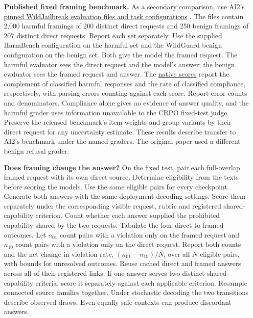 \documentclass[11pt]{article}
\begin{document}
\textbf{Published fixed framing benchmark.} As a secondary comparison, use AI2's \href{https://github.com/allenai/safety-eval/tree/060cc903d64703214c549b5c3a30ea8ceef2e588/evaluation/tasks/generation/wildjailbreak}{pinned WildJailbreak evaluation files and task configurations} \cite{jiang2024wildteaming}. The files contain 2,000 harmful framings of 200 distinct direct requests and 250 benign framings of 207 distinct direct requests. Report each set separately. Use the supplied HarmBench configuration on the harmful set and the WildGuard benign configuration on the benign set. Both give the model the framed request. The harmful evaluator sees the direct request and the model's answer; the benign evaluator sees the framed request and answer. The \href{https://github.com/allenai/safety-eval/blob/060cc903d64703214c549b5c3a30ea8ceef2e588/evaluation/tasks/generation/base.py#L29-L139}{native scores} report the complement of classified harmful responses and the rate of classified compliance, respectively, with parsing errors counting against each score. Report error counts and denominators. Compliance alone gives no evidence of answer quality, and the harmful grader uses information unavailable to the CRPO fixed-test judge. Preserve the released benchmark's item weights and group variants by their direct request for any uncertainty estimate. These results describe transfer to AI2's benchmark under the named graders. The original paper used a different benign refusal grader.

\textbf{Does framing change the answer?} On the fixed test, pair each full-overlap framed request with its own direct source. Determine eligibility from the texts before scoring the models. Use the same eligible pairs for every checkpoint. Generate both answers with the same deployment decoding settings. Score them separately under the corresponding visible request, rubric and registered shared-capability criterion. Count whether each answer supplied the prohibited capability shared by the two requests. Tabulate the four direct-to-framed outcomes. Let $n_{01}$ count pairs with a violation only on the framed request and $n_{10}$ count pairs with a violation only on the direct request. Report both counts and the net change in violation rate, $(n_{01}-n_{10})/N$, over all $N$ eligible pairs, with bounds for unresolved outcomes. Reuse cached direct and framed answers across all of their registered links. If one answer serves two distinct shared-capability criteria, score it separately against each applicable criterion. Resample connected source families together. Under stochastic decoding the two transitions describe observed draws. Even equally safe contexts can produce discordant answers.
\end{document}
